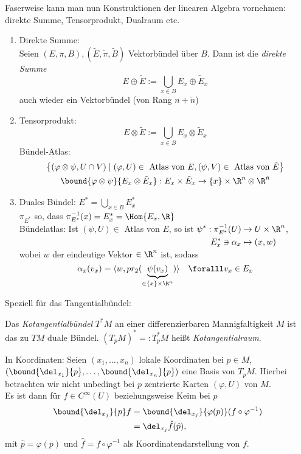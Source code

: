\lecture
Faserweise kann man nun Konstruktionen der linearen Algebra vornehmen: direkte Summe, Tensorprodukt, Dualraum etc.

\begin{exmp}
	\begin{enumerate}[label={\roman*})]
		\item Direkte Summe:\\
			Seien $ (E,\pi,B),(\tilde{E},\tilde{\pi},\tilde{B}) $ Vektorbündel über $B$. Dann ist die \emph{direkte Summe}
			\[ E \oplus \tilde{E} := \bigcup_{x \in B} E_x \oplus \tilde{E}_x \]
			auch wieder ein Vektorbündel (von Rang $n + \tilde{n}$)
		\item Tensorprodukt:
			\[ E \otimes \tilde{E} := \bigcup_{x \in B} E_x \otimes \tilde{E}_x \]
		Bündel-Atlas:
			\begin{gather*}
				\left\{ (\varphi \otimes \psi, U \cap V) \mid (\varphi,U) \in \ \text{Atlas von }E, (\psi,V) \in \ \text{Atlas von } \tilde{E} \right\}\\
				\bound{\varphi \otimes \psi}{E_x \otimes \tilde{E}_x} : E_x \times \tilde{E}_x \to \{x\} \times \R^n \otimes \R^{\tilde{n}}
			\end{gather*}
		\item Duales Bündel: $ E^* = \bigcup_{x \in B} E_x^* $\\
			$ \pi_{E^*} $ so, dass $ \pi_{E^*}^{-1} (x) = E_x^* = \Hom{E_x,\R} $\\
			Bündelatlas: Ist $ (\psi,U) \in $ Atlas von $E$, so ist $ \begin{aligned}[t]
				\psi^*: \pi_{E^*}^{-1} (U) &\to U \times \R^n\\
				E_x^* \ni \alpha_x &\mapsto (x,w)
			\end{aligned} $, wobei $w$ der eindeutige Vektor $\in \R^n$ ist, sodass
			\[ \alpha_x (v_x) = \langle w,pr_2(\underbrace{\psi(v_x)}_{\in \{x\} \times \R^n}) \rangle \quad \foralll v_x  \in E_x \]
	\end{enumerate}
\end{exmp}

Speziell für das Tangentialbündel:

\begin{defn}[Kotangentialbündel]
	Das \emph{Kotangentialbündel} $T^*M$ an einer differenzierbaren Mannigfaltigkeit $M$ ist das zu $TM$ duale Bündel. $ (T_pM)^* =: T_p^*M $ heißt \emph{Kotangentialraum}.
\end{defn}

In Koordinaten: Seien $ (x_1,\dotsc,x_n) $ lokale Koordinaten bei $p \in M$, $ \left( \bound{\del_{x_1}}{p},\dotsc, \bound{\del_{x_n}}{p} \right) $ eine Basis von $T_pM$. Hierbei betrachten wir nicht unbedingt bei $p$ zentrierte Karten $ (\varphi,U) $ von $M$.\\
Es ist dann für $f \in C^\infty(U)$ beziehungsweise Keim bei $p$
\begin{align*}
	\bound{\del_{x_j}}{p}f &= \bound{\del_{x_j}}{\varphi(p)} (f \circ \varphi^{-1})\\
	&= \del_{x_j} \hat{f} (\hat{p}),
\end{align*}
mit $\hat{p} = \varphi(p)$ und $\hat{f} = f \circ \varphi^{-1}$ als Koordinatendarstellung von $f$.

